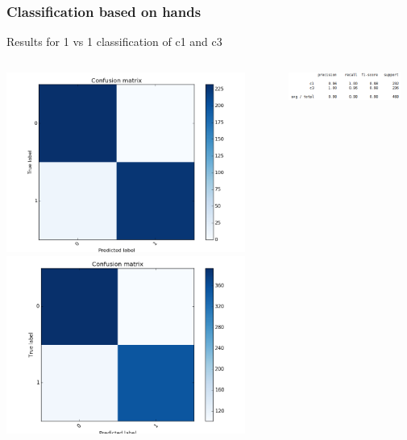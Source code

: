 \documentclass{beamer}
\begin{document}
	\begin{frame}
		\frametitle{Classification based on hands}
		Results for 1 vs 1 classification of c1 and c3
		\begin{columns}
			\begin{column}{0.3\textwidth}
				\begin{center}
					\includegraphics[width=0.9\textwidth]{handpose_p8_c1+c3}\\			
					\includegraphics[width=0.9\textwidth]{handpose_p20_c1+c3}\\
				\end{center}
			\end{column}
			\begin{column}{0.7\textwidth}
				\begin{center}
					\includegraphics[width=0.9\textwidth]{handpose_p8_c1+c3_txt}\\

\end{center}
\end{column}
\end{columns}
\end{frame}
\end{document}
